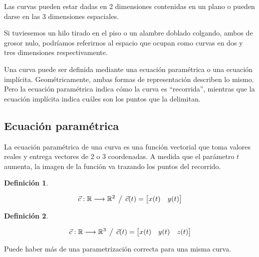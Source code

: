 \documentclass[a5paper,12pt,twoside]{book}
\newtheorem{defn}{{Definición}}[chapter]
\begin{document}
Las curvas pueden estar dadas en 2 dimensiones contenidas en un plano o pueden darse en las 3 dimensiones espaciales.

Si tuviesemos un hilo tirado en el piso o un alambre doblado colgando, ambos de grosor nulo, podríamos referirnos al espacio que ocupan como curvas en dos y tres dimensiones respectivamente.

Una curva puede ser definida mediante una ecuación paramétrica o una ecuación implícita. Geométricamente, ambas formas de representación describen lo mismo. Pero la ecuación paramétrica indica cómo la curva es ``recorrida'', mientras que la ecuación implícita indica cuáles son los puntos que la delimitan.


\subsection{Ecuación paramétrica}

La ecuación paramétrica de una curva es una función vectorial que toma valores reales y entrega vectores de 2 o 3 coordenadas. A medida que el parámetro $t$ aumenta, la imagen de la función va trazando los puntos del recorrido.

\begin{mdframed}[style=MyFrame1]
    \begin{defn}
    \end{defn}
    \begin{equation*}
        \Vec{c}: \mathbb{R} \longrightarrow \mathbb{R}^2 \hspace{1ex} \big/ \hspace{1ex} \Vec{c}(t) = \begin{bmatrix} x(t) & y(t) \end{bmatrix}
    \end{equation*}
\end{mdframed}

\begin{mdframed}[style=MyFrame1]
    \begin{defn}
    \end{defn}
    \begin{equation*}
        \Vec{c}: \mathbb{R} \longrightarrow \mathbb{R}^3 \hspace{1ex} \big/ \hspace{1ex} \Vec{c}(t) = \begin{bmatrix} x(t) & y(t) & z(t) \end{bmatrix}
    \end{equation*}
\end{mdframed}

Puede haber más de una parametrización correcta para una misma curva.
\end{document}
